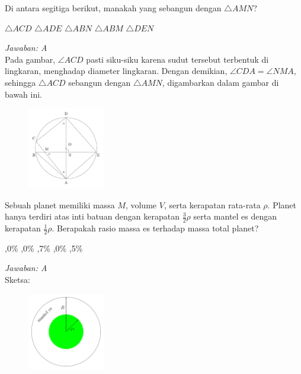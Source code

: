 \documentclass[11pt,fleqn]{exam}
\begin{document}
\begin{questions}
\noindent Di antara segitiga berikut, manakah yang sebangun dengan $\bigtriangleup AMN$?
\begin{choices}
\choice $\bigtriangleup ACD$
\choice $\bigtriangleup ADE$
\choice $\bigtriangleup ABN$
\choice $\bigtriangleup ABM$
\choice $\bigtriangleup DEN$
\end{choices}

\textit{Jawaban: A}\\
Pada gambar, $\angle ACD$ pasti siku-siku karena sudut tersebut terbentuk di lingkaran, menghadap diameter lingkaran. Dengan demikian, $\angle CDA=\angle NMA$, sehingga $\bigtriangleup ACD$ sebangun dengan $\bigtriangleup AMN$, digambarkan dalam gambar di bawah ini.
\begin{figure}[H]
\centering
\includegraphics[width=0.3\textwidth]{gambar/lingk-seg4-sol.pdf}
\end{figure}


\question Sebuah planet memiliki massa $M$, volume $V$, serta kerapatan rata-rata $\rho$. Planet hanya terdiri atas inti batuan dengan kerapatan $\frac{3}{2}\rho$ serta mantel es dengan kerapatan $\frac{1}{2}\rho$. Berapakah rasio massa es terhadap massa total planet?
\begin{choices}
,0\%
,0\%
,7\%
,0\%
,5\%
\end{choices}

\textit{Jawaban: A}\\
Sketsa:
\begin{figure}[H]
\centering
\includegraphics[width=0.3\textwidth]{gambar/planet-es.pdf}
\end{figure}


\end{questions}
\end{document}
